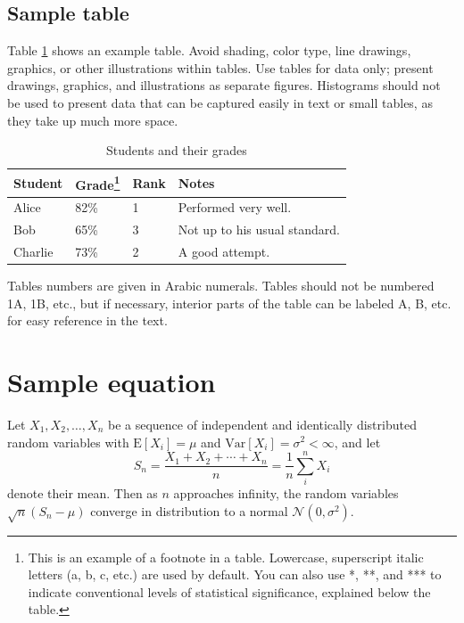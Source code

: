 \documentclass[9pt,twocolumn,twoside,lineno]{gsag3jnl}
\begin{document}
\subsection{Sample table}

Table \ref{tab:shape-functions} shows an example table. Avoid shading, color type, line drawings, graphics, or other illustrations within tables. Use tables for data only; present drawings, graphics, and illustrations as separate figures. Histograms should not be used to present data that can be captured easily in text or small tables, as they take up much more space.

\begin{table}[p]
\centering
\caption{Students and their grades}
\begin{tableminipage}{\textwidth}
\begin{tabularx}{\textwidth}{@{}XXXX@{}}
\hline
{\bf Student} & {\bf Grade}\footnote{This is an example of a footnote in a table. Lowercase, superscript italic letters (a, b, c, etc.) are used by default. You can also use *, **, and *** to indicate conventional levels of statistical significance, explained below the table.} & {\bf Rank} & {\bf Notes}\\
\hline
Alice & 82\% & 1 & Performed very well.\\
Bob & 65\% & 3 & Not up to his usual standard.\\
Charlie & 73\% & 2 & A good attempt.\\
\hline
\end{tabularx}
  \label{tab:shape-functions}
\end{tableminipage}
\end{table}

Tables numbers are given in Arabic numerals. Tables should not be numbered 1A, 1B, etc., but if necessary, interior parts of the table can be labeled A, B, etc. for easy reference in the text.

\section{Sample equation}

Let $X_1, X_2, \ldots, X_n$ be a sequence of independent and identically distributed random variables with $\text{E}[X_i] = \mu$ and $\text{Var}[X_i] = \sigma^2 < \infty$, and let
\begin{equation}
S_n = \frac{X_1 + X_2 + \cdots + X_n}{n}
      = \frac{1}{n}\sum_{i}^{n} X_i
\label{eq:refname1}
\end{equation}
denote their mean. Then as $n$ approaches infinity, the random variables $\sqrt{n}(S_n - \mu)$ converge in distribution to a normal $\mathcal{N}(0, \sigma^2)$.
\end{document}
